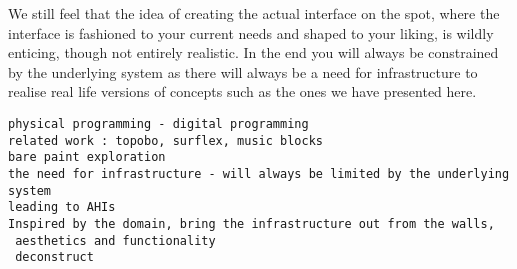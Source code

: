 
We still feel that the idea of creating the actual interface on the spot, where the interface is fashioned to your current needs and shaped to your liking, is wildly enticing, though not entirely realistic.
In the end you will always be constrained by the underlying system as there will always be a need for infrastructure to realise real life versions of concepts such as the ones we have presented here.

\begin{verbatim}
physical programming - digital programming
related work : topobo, surflex, music blocks
bare paint exploration
the need for infrastructure - will always be limited by the underlying system
leading to AHIs
Inspired by the domain, bring the infrastructure out from the walls,
 aesthetics and functionality
 deconstruct
\end{verbatim}
